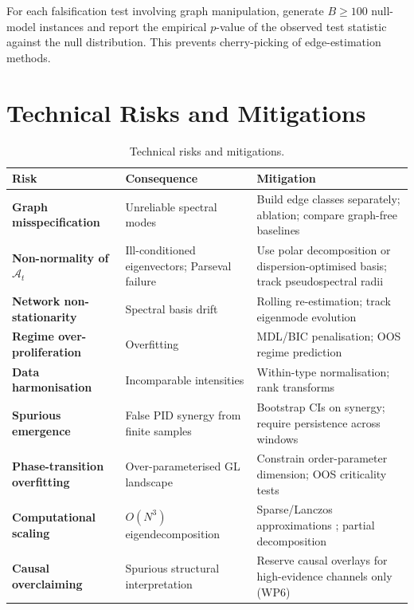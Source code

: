 \documentclass[11pt,a4paper]{article}
\theoremstyle{definition}
\begin{document}
\begin{keybox}
For each falsification test involving graph manipulation, generate $B \geq 100$ null-model instances and report the empirical $p$-value of the observed test statistic against the null distribution. This prevents cherry-picking of edge-estimation methods.
\end{keybox}


\section{Technical Risks and Mitigations}
\label{sec:risks}

\begin{table}[H]
\centering\small
\begin{tabularx}{\textwidth}{@{}>{\bfseries}p{3.2cm}p{3.5cm}X@{}}
\toprule
Risk & Consequence & Mitigation \\
\midrule
Graph misspecification & Unreliable spectral modes & Build edge classes separately; ablation; compare graph-free baselines \\
Non-normality of $\mathcal{A}_t$ & Ill-conditioned eigenvectors; Parseval failure & Use polar decomposition or dispersion-optimised basis; track pseudospectral radii \\
Network non-stationarity & Spectral basis drift & Rolling re-estimation; track eigenmode evolution \\
Regime over-proliferation & Overfitting & MDL/BIC penalisation; OOS regime prediction \\
Data harmonisation & Incomparable intensities & Within-type normalisation; rank transforms \\
Spurious emergence & False PID synergy from finite samples & Bootstrap CIs on synergy; require persistence across windows \\
Phase-transition overfitting & Over-parameterised GL landscape & Constrain order-parameter dimension; OOS criticality tests \\
Computational scaling & $O(N^3)$ eigendecomposition & Sparse/Lanczos approximations \citep{lehoucq1998arpack}; partial decomposition \\
Causal overclaiming & Spurious structural interpretation & Reserve causal overlays for high-evidence channels only (WP6) \\
\bottomrule
\end{tabularx}
\caption{Technical risks and mitigations.}
\label{tab:risks}
\end{table}
\end{document}
